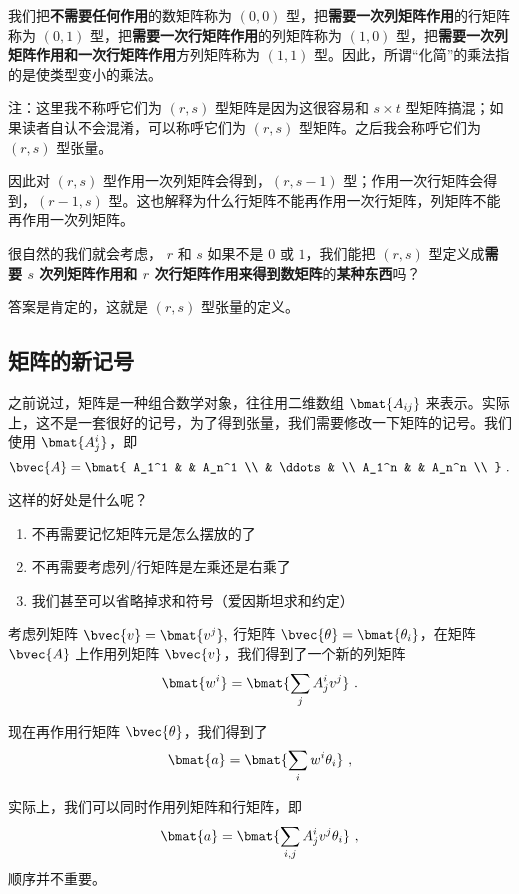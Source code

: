 我们把\textbf{不需要任何作用}的数矩阵称为 $(0,0)$ 型，把\textbf{需要一次列矩阵作用}的行矩阵称为 $(0,1)$ 型，把\textbf{需要一次行矩阵作用}的列矩阵称为 $(1,0)$ 型，把\textbf{需要一次列矩阵作用和一次行矩阵作用}方列矩阵称为 $(1,1)$ 型。因此，所谓“化简”的乘法指的是使类型变小的乘法。

注：这里我不称呼它们为 $(r, s)$ 型矩阵是因为这很容易和 $s \times t$ 型矩阵搞混；如果读者自认不会混淆，可以称呼它们为 $(r, s)$ 型矩阵。之后我会称呼它们为$(r, s)$ 型张量。

因此对 $(r, s)$ 型作用一次列矩阵会得到，$(r, s - 1)$ 型；作用一次行矩阵会得到，$(r - 1, s)$ 型。这也解释为什么行矩阵不能再作用一次行矩阵，列矩阵不能再作用一次列矩阵。

很自然的我们就会考虑， $r$ 和 $s$ 如果不是 $0$ 或 $1$，我们能把 $(r, s)$ 型定义成\textbf{需要 $s$ 次列矩阵作用和 $r$ 次行矩阵作用来得到数矩阵}的\textbf{某种东西}吗？

答案是肯定的，这就是 $(r, s)$ 型张量的定义。

\subsection{矩阵的新记号}

之前说过，矩阵是一种组合数学对象，往往用二维数组 $\bmat{A_{i j}}$ 来表示。实际上，这不是一套很好的记号，为了得到张量，我们需要修改一下矩阵的记号。我们使用 $\bmat{A^i_j}$，即
$$
\bvec{A} = \bmat{
A_1^1 &  & A_n^1 \\
 & \ddots & \\
A_1^n &  & A_n^n \\
}~.
$$

这样的好处是什么呢？
\begin{enumerate}
\item 不再需要记忆矩阵元是怎么摆放的了
\item 不再需要考虑列/行矩阵是左乘还是右乘了
\item 我们甚至可以省略掉求和符号（爱因斯坦求和约定）
\end{enumerate}


考虑列矩阵 $\bvec{v} = \bmat{v^j},$ 行矩阵 $\bvec{\theta} = \bmat{\theta_i}$，在矩阵 $\bvec{A}$ 上作用列矩阵 $\bvec{v}$，我们得到了一个新的列矩阵
$$
\bmat{w^i} = \bmat{\sum_j A^i_j v^j}~.
$$

现在再作用行矩阵 $\bvec{\theta}$，我们得到了
$$
\bmat{a} = \bmat{\sum_i w^i \theta_i}~,
$$

实际上，我们可以同时作用列矩阵和行矩阵，即
$$
\bmat{a} = \bmat{\sum_{i, j} A^i_j v^j \theta_i}~,
$$
顺序并不重要。

